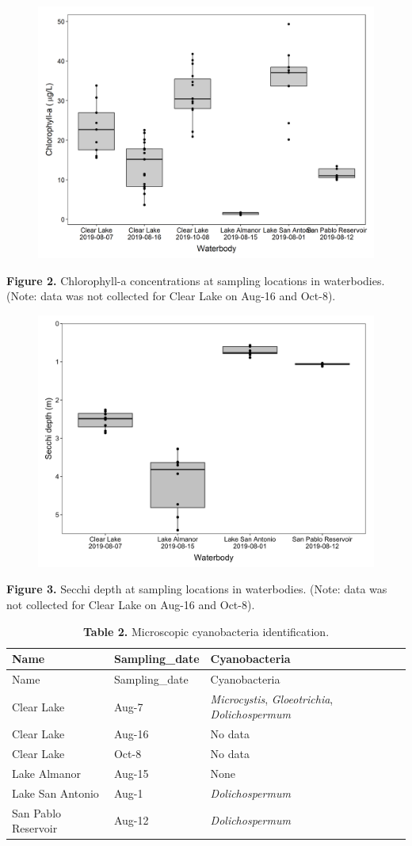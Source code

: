 \documentclass[]{article}
\begin{document}
\begin{figure}

{\centering \includegraphics[width=0.6\linewidth]{../Data/Figures_output/chla} 

}

\end{figure}

\textbf{Figure 2.} Chlorophyll-a concentrations at sampling locations in
waterbodies. (Note: data was not collected for Clear Lake on Aug-16 and
Oct-8).

\begin{figure}

{\centering \includegraphics[width=0.6\linewidth]{../Data/Figures_output/secchi} 

}

\end{figure}

\textbf{Figure 3.} Secchi depth at sampling locations in waterbodies.
(Note: data was not collected for Clear Lake on Aug-16 and Oct-8).

\begin{longtable}[]{@{}lll@{}}
\caption{\textbf{Table 2.} Microscopic cyanobacteria
identification.}\tabularnewline
\toprule
Name & Sampling\_date & Cyanobacteria\tabularnewline
\midrule
\endfirsthead
\toprule
Name & Sampling\_date & Cyanobacteria\tabularnewline
\midrule
\endhead
Clear Lake & Aug-7 & \emph{Microcystis}, \emph{Gloeotrichia},
\emph{Dolichospermum}\tabularnewline
Clear Lake & Aug-16 & No data\tabularnewline
Clear Lake & Oct-8 & No data\tabularnewline
Lake Almanor & Aug-15 & None\tabularnewline
Lake San Antonio & Aug-1 & \emph{Dolichospermum}\tabularnewline
San Pablo Reservoir & Aug-12 & \emph{Dolichospermum}\tabularnewline
\bottomrule
\end{longtable}
\end{document}
